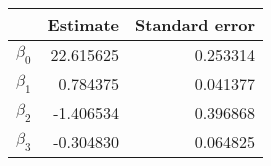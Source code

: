 \begin{tabular}{lrr}
\toprule
{} &   Estimate &  Standard error \\
\midrule
$\beta_0$ &  22.615625 &        0.253314 \\
$\beta_1$ &   0.784375 &        0.041377 \\
$\beta_2$ &  -1.406534 &        0.396868 \\
$\beta_3$ &  -0.304830 &        0.064825 \\
\bottomrule
\end{tabular}

